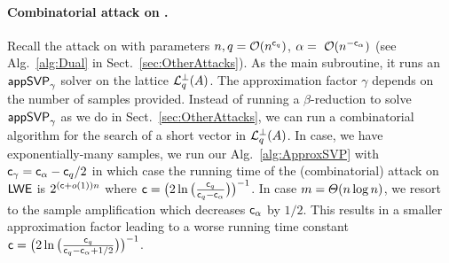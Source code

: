 \paragraph{Combinatorial \DUAL attack on \LWE.} Recall the \DUAL attack on \LWE with parameters $n, q = \mathcal{O}(n^{\mathsf{c}_q})$, $\alpha =~ \mathcal{O}(n^{-\mathsf{c}_{\alpha}})$ (see Alg.~\ref{alg:Dual} in Sect.~\ref{sec:OtherAttacks}). As the main subroutine, it runs an $\textsf{appSVP}_{\gamma}$ solver on the lattice $\mathcal{L}_q^{\perp}(A)$. The approximation factor $\gamma$ depends on the number of \LWE samples provided. Instead of running a $\beta$-\BKZ reduction to solve $\textsf{appSVP}_{\gamma}$ as we do in Sect.~\ref{sec:OtherAttacks}, we can run a combinatorial algorithm for the search of a short vector in $\mathcal{L}_q^{\perp}(A)$. In case, we have exponentially-many samples, we run our Alg.~\ref{alg:ApproxSVP} with $\mathsf{c}_{\gamma} = \mathsf{c}_{\alpha}-\mathsf{c}_q/2$ in which case the running time of the (combinatorial) \DUAL attack on $\textsf{LWE}$ is $2^{(\mathsf{c}+o(1))n}$ where $\mathsf{c} = \big(2 \ln\big(\tfrac{\mathsf{c}_q}{\mathsf{c}_q-\mathsf{c}_{\alpha}} \big) \big)^{-1}$. In case $m=\varTheta(n \log n)$, we resort to the sample amplification which decreases $\mathsf{c}_{\alpha}$ by $1/2$. This results in a smaller approximation factor leading to a worse running time constant $\mathsf{c} = \big(2 \ln\big(\tfrac{\mathsf{c}_q}{\mathsf{c}_q-\mathsf{c}_{\alpha}+1/2} \big) \big)^{-1}$.